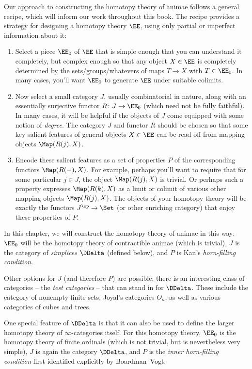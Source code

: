 Our approach to constructing the homotopy theory of animae follows a general recipe, which will inform our work throughout this book.
The recipe provides a strategy for designing a homotopy theory $\EE$, using only partial or imperfect information about it:
\begin{enumerate}
  \item%
    Select a piece $\EE_0$ of $\EE$ that is simple enough that you can understand it completely,
    but complex enough so that any object $X \in \EE$ is completely determined by the sets/groups/whatevers of maps $T \to X$ with $T \in \EE_0$.
    In many cases, you'll want $\EE_0$ to generate $\EE$ under suitable colimits.
  \item%
    Now select a small category $J$, usually combinatorial in nature,
    along with an essentially surjective functor $R \colon J \to \EE_0$ (which need not be fully faithful).
    In many cases, it will be helpful if the objects of $J$ come equipped with some notion of \emph{degree}.
    The category $J$ and functor $R$ should be chosen so that some key salient features of general objects $X \in \EE$ can be read off from mapping objects $\Map(R(j),X)$.
  \item%
    Encode these salient features as a set of properties $P$ of the corresponding functors $\Map(R(-),X)$.
    For example, perhaps you'll want to require that for some particular $j \in J$, the object $\Map(R(j),X)$ is trivial.
    Or perhaps such a property expresses $\Map(R(k),X)$ as a limit or colimit of various other mapping objects $\Map(R(j),X)$.
    The objects of your homotopy theory will be exactly the functors $J^{\op} \to \Set$ (or other enriching category) that enjoy these properties of $P$.
\end{enumerate}

In this chapter, we will construct the homotopy theory of animae in this way:
$\EE_0$ will be the homotopy theory of contractible animae (which is trivial),
$J$ is the category of \emph{simplices} $\DDelta$ (defined below),
and $P$ is Kan's \emph{horn-filling condition}.

Other options for $J$ (and therefore $P$) are possible:
there is an interesting class of categories -- the \emph{test categories} -- that can stand in for $\DDelta$. 
These include the category of nonempty finite sets, Joyal's categories $\Theta_n$, as well as various categories of cubes and trees.

One special feature of $\DDelta$ is that it can also be used to define the larger homotopy theory of $\infty$-categories itself.
For this homotopy theory, $\EE_0$ is the homotopy theory of finite ordinals (which is not trivial, but is nevertheless very simple),
$J$ is again the category $\DDelta$,
and $P$ is the \emph{inner horn-filling condition} first identified explicitly by Boardman--Vogt.






